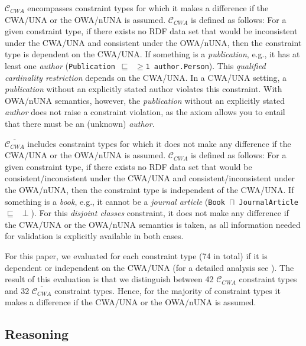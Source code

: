 \documentclass{llncs}
\newcommand{\ms}[1]{\texttt{#1}}
\begin{document}
$\mathcal{C}_{CWA}$ encompasses constraint types for which it makes a difference if the CWA/UNA or the OWA/nUNA is assumed.
$\mathcal{C}_{CWA}$ is defined as follows:
For a given constraint type, if there exists no RDF data set that would be inconsistent under the CWA/UNA and
consistent under the OWA/nUNA, then the constraint type is dependent on the CWA/UNA.
If something is a \emph{publication}, e.g., it has at least one \emph{author} (\ms{Publication $\sqsubseteq$ $\geq$1 author.Person}).
This {\em qualified cardinality restriction} depends on the CWA/UNA.
In a CWA/UNA setting, a \emph{publication} without an explicitly stated author violates this constraint.  
With OWA/nUNA semantics, however,
the \emph{publication} without an explicitly stated \emph{author} does not raise a constraint violation, 
as the axiom allows you to entail that there must be an (unknown) \emph{author}.

$\overline{\mathcal{C}_{CWA}}$ includes constraint types for which it does not make any difference if the CWA/UNA or the OWA/nUNA is assumed.
$\mathcal{C}_{CWA}$ is defined as follows:
For a given constraint type, if there exists no RDF data set that would be consistent/inconsistent under the CWA/UNA and
consistent/inconsistent under the OWA/nUNA, then the constraint type is independent of the CWA/UNA.
If something is a \emph{book}, e.g., it cannot be a \emph{journal article} (\ms{Book $\sqcap$ JournalArticle $\sqsubseteq$ $\perp$}).
For this {\em disjoint classes} constraint, it does not make any difference if the CWA/UNA or the OWA/nUNA semantics is taken,
as all information needed for validation is explicitly available in both cases. 

For this paper, we evaluated for each constraint type (74 in total) if it is dependent or independent on the CWA/UNA (for a detailed analysis see \cite{BoschNolleAcarEckert2015}). 
The result of this evaluation is that we distinguish between 42 $\mathcal{C}_{CWA}$ constraint types and 32 $\overline{\mathcal{C}_{CWA}}$ constraint types.
Hence, for the majority of constraint types it makes a difference if the CWA/UNA or the OWA/nUNA is assumed.

\subsection{Reasoning}

\end{document}
